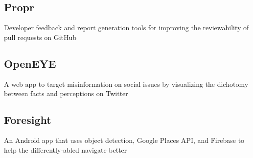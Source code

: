 \documentclass[]{Achyudh_Resume}
\begin{document}
\begin{minipage}[t]{0.32\textwidth}
\subsection{Propr}
Developer feedback and report generation tools for improving the reviewability of pull requests on GitHub \\

\subsection{OpenEYE}
A web app to target misinformation on social issues by visualizing the dichotomy between facts and perceptions on Twitter \\

\subsection{Foresight}
An Android app that uses object detection, Google Places API, and Firebase to help the differently-abled navigate better \\




\end{minipage}
\end{document}
